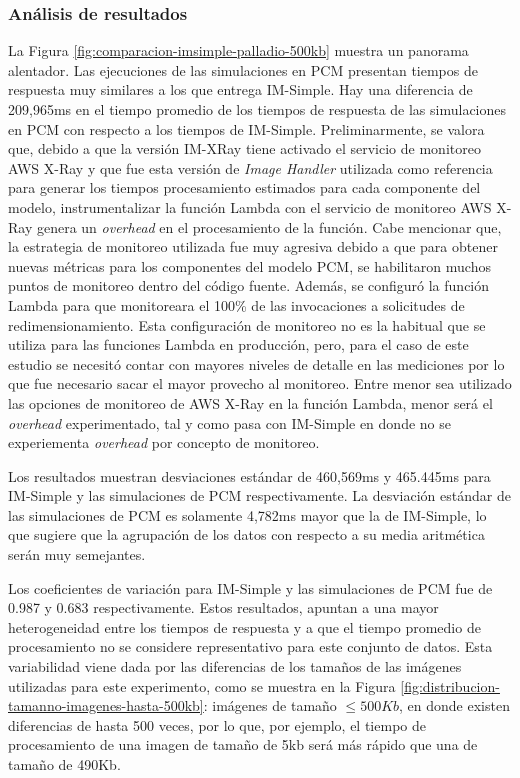 \subsubsection{Análisis de resultados} 
La Figura \ref{fig:comparacion-imsimple-palladio-500kb} muestra un panorama alentador. Las ejecuciones de las simulaciones en PCM presentan tiempos de respuesta muy similares a los que entrega IM-Simple. Hay una diferencia de 209,965ms en el tiempo promedio de los tiempos de respuesta de las simulaciones en PCM con respecto a los tiempos de IM-Simple. Preliminarmente, se valora que, debido a que la versión IM-XRay tiene activado el servicio de monitoreo AWS X-Ray y que fue esta versión de \emph{Image Handler} utilizada como referencia para generar los tiempos procesamiento estimados para cada componente del modelo, instrumentalizar la función Lambda con el servicio de monitoreo AWS X-Ray genera un \emph{overhead} en el procesamiento de la función. Cabe mencionar que, la estrategia de monitoreo utilizada fue muy agresiva debido a que para obtener nuevas métricas para los componentes del modelo PCM, se habilitaron muchos puntos de monitoreo dentro del código fuente. Además, se configuró la función Lambda para que monitoreara el 100\% de las invocaciones a solicitudes de redimensionamiento. Esta configuración de monitoreo no es la habitual que se utiliza para las funciones Lambda en producción, pero, para el caso de este estudio se necesitó contar con mayores niveles de detalle en las mediciones por lo que fue necesario sacar el mayor provecho al monitoreo. Entre menor sea utilizado las opciones de monitoreo de AWS X-Ray en la función Lambda, menor será el \emph{overhead} experimentado, tal y como pasa con IM-Simple en donde no se experiementa \emph{overhead} por concepto de monitoreo.

Los resultados muestran desviaciones estándar de 460,569ms y 465.445ms para IM-Simple y las simulaciones de PCM respectivamente. La desviación estándar de las simulaciones de PCM es solamente 4,782ms mayor que la de IM-Simple, lo que sugiere que la agrupación de los datos con respecto a su media aritmética serán muy semejantes.

Los coeficientes de variación para IM-Simple y las simulaciones de PCM fue de 0.987 y 0.683 respectivamente. Estos resultados, apuntan a una mayor heterogeneidad entre los tiempos de respuesta y a que el tiempo promedio de procesamiento no se considere representativo para este conjunto de datos. Esta variabilidad viene dada por las diferencias de los tamaños de las imágenes utilizadas para este experimento, como se muestra en la Figura \ref{fig:distribucion-tamanno-imagenes-hasta-500kb}: imágenes de tamaño $\leq 500Kb$, en donde existen diferencias de hasta 500 veces, por lo que, por ejemplo, el tiempo de procesamiento de una imagen de tamaño de 5kb será más rápido que una de tamaño de 490Kb.


